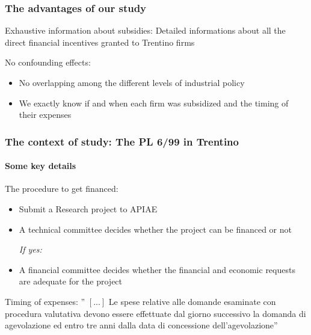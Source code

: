 \documentclass[10pt,handout,xcolor=pdftex,dvipsnames,table]{beamer}
\begin{document}
\begin{frame}
\frametitle{The advantages of our study}
\begin{block} {Exhaustive information about subsidies:}
		 Detailed informations about all the direct financial incentives granted to Trentino firms
\end{block}

\begin{block} {No confounding effects: }
	\begin{itemize}
		\item No overlapping among the different levels of industrial policy
		\item We exactly know  if and when each firm was  subsidized and the timing of their expenses
\end{itemize}
\end{block}

\end{frame}
\begin{frame}
\frametitle{The context of study: The PL 6/99 in Trentino}
\framesubtitle{Some key details}
{\footnotesize
\begin{block} {The procedure to get financed:}
\begin{itemize}
	\item Submit a Research project to APIAE
\item A technical committee decides whether the project can be financed or not

{\it If yes:}
\item A financial committee decides whether the financial and economic requests are adequate for the project
\end{itemize}
\end{block}
\begin{block} { Timing of expenses:}
'' $\left[...\right]$ Le spese relative alle domande esaminate con procedura valutativa devono essere effettuate dal giorno successivo la domanda di agevolazione ed entro tre anni dalla data di concessione dell'agevolazione''
\end{block}
}
\end{frame}
\end{document}
